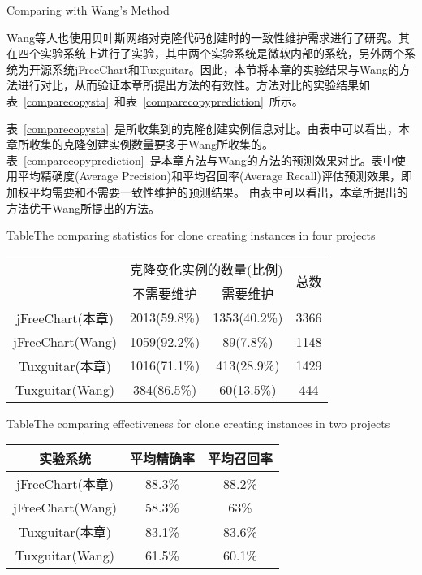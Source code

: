 {Comparing with Wang’s Method}

Wang\cite{wang2014predicting}等人也使用贝叶斯网络对克隆代码创建时的一致性维护需求进行了研究。其在四个实验系统上进行了实验，其中两个实验系统是微软内部的系统，另外两个系统为开源系统jFreeChart和Tuxguitar。因此，本节将本章的实验结果与Wang的方法进行对比，从而验证本章所提出方法的有效性。方法对比的实验结果如表~\ref{comparecopysta}~和表~\ref{comparecopyprediction}~所示。

表~\ref{comparecopysta}~是所收集到的克隆创建实例信息对比。由表中可以看出，本章所收集的克隆创建实例数量要多于Wang所收集的。
表~\ref{comparecopyprediction}~是本章方法与Wang的方法的预测效果对比。表中使用平均精确度(Average Precision)和平均召回率(Average Recall)评估预测效果，即加权平均需要和不需要一致性维护的预测结果。
由表中可以看出，本章所提出的方法优于Wang所提出的方法。

\begin{table}[htbp]
{Table$\!$}{The comparing statistics for clone creating instances in four projects}
\vspace{0.5em}
\centering
\wuhao
\begin{tabular}{cccc}
\toprule[1.5pt]
~\multirow{2}{*}{实验系统}& \multicolumn{2}{c}{克隆变化实例的数量(比例)} & \multirow{2}{*}{总数}\\ 
 \cline{2-3}
~&{不需要维护} &{需要维护} & ~\\
\midrule[1pt]
jFreeChart(本章)&	2013(59.8\%)&	1353(40.2\%)&	3366\\
jFreeChart(Wang)&1059(92.2\%)&	89(7.8\%)&	1148\\
Tuxguitar(本章)&	1016(71.1\%)&	413(28.9\%)&	1429\\
Tuxguitar(Wang)&384(86.5\%)&	60(13.5\%)&	444\\
\bottomrule[1.5pt]
\end{tabular}
\end{table}

\begin{table}[htbp]
{Table$\!$}{The comparing effectiveness for clone creating instances in two projects}
\vspace{0.5em}
\centering
\wuhao
\begin{tabular}{ccc}
\toprule[1.5pt]
{实验系统}&{平均精确率} &{平均召回率}\\ 
\midrule[1pt]
jFreeChart(本章)&	88.3\%& 88.2\%\\
jFreeChart(Wang)&58.3\%&	63\%\\
Tuxguitar(本章)&	83.1\%&	83.6\%\\
Tuxguitar(Wang)&61.5\%&	60.1\%\\
\bottomrule[1.5pt]
\end{tabular}
\end{table}

